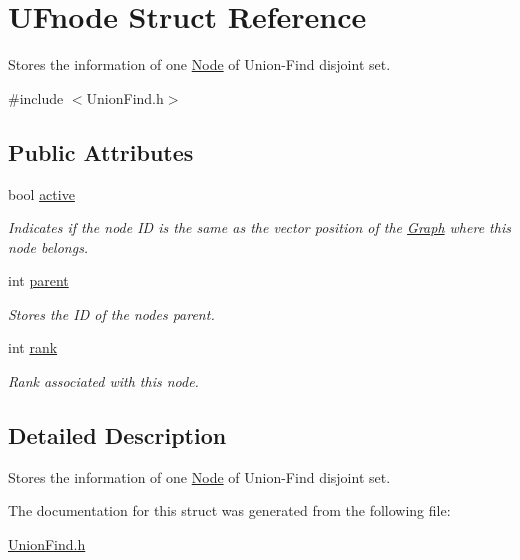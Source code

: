 \hypertarget{structUFnode}{}\section{U\+Fnode Struct Reference}
\label{structUFnode}


Stores the information of one \hyperlink{structNode}{Node} of Union-\/\+Find disjoint set.  




{\ttfamily \#include $<$Union\+Find.\+h$>$}

\subsection*{Public Attributes}
\begin{DoxyCompactItemize}
\item 
\mbox{\label{structUFnode_a5da91e36c72c53109c132998c9b9f891}} 
bool \hyperlink{structUFnode_a5da91e36c72c53109c132998c9b9f891}{active}
\begin{DoxyCompactList}\small\item\em Indicates if the node ID is the same as the vector position of the \hyperlink{classGraph}{Graph} where this node belongs. \end{DoxyCompactList}\item 
\mbox{\label{structUFnode_a411a81eb74e9df698959864be360a63e}} 
int \hyperlink{structUFnode_a411a81eb74e9df698959864be360a63e}{parent}
\begin{DoxyCompactList}\small\item\em Stores the ID of the node\textquotesingle{}s parent. \end{DoxyCompactList}\item 
\mbox{\label{structUFnode_a3ea776628a898e0f4f3bbfa09334077e}} 
int \hyperlink{structUFnode_a3ea776628a898e0f4f3bbfa09334077e}{rank}
\begin{DoxyCompactList}\small\item\em Rank associated with this node. \end{DoxyCompactList}\end{DoxyCompactItemize}


\subsection{Detailed Description}
Stores the information of one \hyperlink{structNode}{Node} of Union-\/\+Find disjoint set. 

The documentation for this struct was generated from the following file\+:\begin{DoxyCompactItemize}
\item 
\hyperlink{UnionFind_8h}{Union\+Find.\+h}\end{DoxyCompactItemize}

